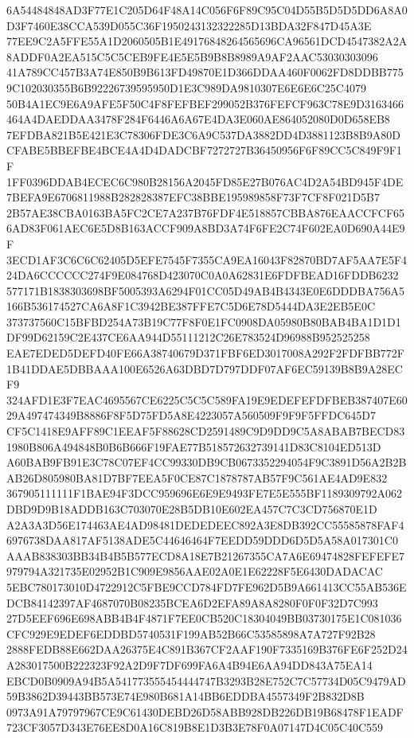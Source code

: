 \documentclass[UTF8,fontset=fandol,zihao=-4,a4paper]{ctexart}
\begin{document}
{{6A54484848AD3F77E1C205D64F48A14C056F6F89C95C04D55B5D5D5DD6A8A0D3F7460E38CCA539D055C36F1950243132322285D13BDA32F847D45A3E
77EE9C2A5FFE55A1D2060505B1E49176848264565696CA96561DCD4547382A2A8ADDF0A2EA515C5C5CEB9FE4E5E5B9B8B8989A9AF2AAC53030303096
41A789CC457B3A74E850B9B613FD49870E1D366DDAA460F0062FD8DDBB7759C102030355B6B92226739595950D1E3C989DA9810307E6E6E6C25C4079
50B4A1EC9E6A9AFE5F50C4F8FEFBEF299052B376FEFCF963C78E9D3163466464A4DAEDDAA3478F284F6446A6A67E4DA3E060AE864052080D0D658EB8
7EFDBA821B5E421E3C78306FDE3C6A9C537DA3882DD4D3881123B8B9A80DCFABE5BBEFBE4BCE4A4D4DADCBF7272727B36450956F6F89CC5C849F9F1F
1FF0396DDAB4ECEC6C980B28156A2045FD85E27B076AC4D2A54BD945F4DE7BEFA9E6706811988B282828387EFC38BBE195989858F73F7CF8F021D5B7
2B57AE38CBA0163BA5FC2CE7A237B76FDF4E518857CBBA876EAACCFCF656AD83F061AEC6E5D8B163ACCF909A8BD3A74F6FE2C74F602EA0D690A44E9F
3ECD1AF3C6C6C62405D5EFE7545F7355CA9EA16043F82870BD7AF5AA7E5F424DA6CCCCCC274F9E084768D423070C0A0A62831E6FDFBEAD16FDDB6232
577171B1838303698BF5005393A6294F01CC05D49AB4B4343E0E6DDDBA756A5166B536174527CA6A8F1C3942BE387FFE7C5D6E78D5444DA3E2EB5E0C
373737560C15BFBD254A73B19C77F8F0E1FC0908DA05980B80BAB4BA1D1D1DF99D62159C2E437CE6AA944D55111212C26E783524D96988B952525258
EAE7EDED5DEFD40FE66A38740679D371FBF6ED3017008A292F2FDFBB772F1B41DDAE5DBBAAA100E6526A63DBD7D797DDF07AF6EC59139B8B9A28ECF9
324AFD1E3F7EAC4695567CE6225C5C5C589FA19E9EDEFEFDFBEB387407E6029A497474349B8886F8F5D75FD5A8E4223057A560509F9F9F5FFDC645D7
CF5C1418E9AFF89C1EEAF5F88628CD2591489C9D9DD9C5A8ABAB7BECD831980B806A494848B0B6B666F19FAE77B518572632739141D83C8104ED513D
A60BAB9FB91E3C78C07EF4CC99330DB9CB0673352294054F9C3891D56A2B2BAB26D805980BA81D7BF7EEA5F0CE87C1878787AB57F9C561AE4AD9E832
367905111111F1BAE94F3DCC959696E6E9E9493FE7E5E555BF1189309792A062DBD9D9B18ADDB163C703070E28B5DB10E602EA457C7C3CD756870E1D
A2A3A3D56E174463AE4AD98481DEDEDEEC892A3E8DB392CC55585878FAF46976738DAA817AF5138ADE5C44646464F7EEDD59DDD6D5D5A58A017301C0
AAAB838303BB34B4B5B577ECD8A18E7B21267355CA7A6E69474828FEFEFE7979794A321735E02952B1C909E9856AAE02A0E1E62228F5E6430DADACAC
5EBC780173010D4722912C5FBE9CCD784FD7FE962D5B9A661413CC55AB536EDCB84142397AF4687070B08235BCEA6D2EFA89A8A8280F0F0F32D7C993
27D5EEF696E698ABB4B4F4871F7EE0CB520C18304049BB03730175E1C081036CFC929E9EDEF6EDDBD5740531F199AB52B66C53585898A7A727F92B28
2888FEDB88E662DAA26375E4C891B367CF2AAF190F7335169B376FE6F252D24A283017500B222323F92A2D9F7DF699FA6A4B94E6AA94DD843A75EA14
EBCD0B0909A94B5A541773555454444747B3293B28E752C7C57734D05C9479AD59B3862D39443BB573E74E980B681A14BB6EDDBA4557349F2B832D8B
0973A91A79797967CE9C61430DEBD26D58ABB928DB226DB19B68478F1EADF723CF3057D343E76EE8D0A16C819B8E1D3B3E78F0A07147D4C05C40C559
}}
\end{document}
